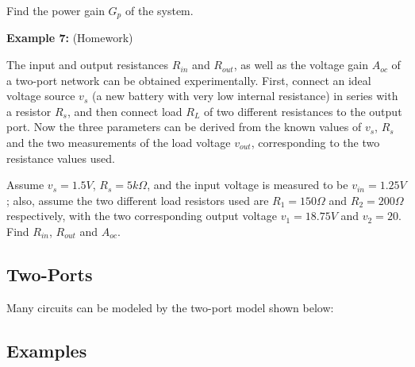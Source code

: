 Find the power gain $G_p$ of the system.



{\bf Example 7:} (Homework)

The input and output resistances $R_{in}$ and $R_{out}$, as well as the voltage 
gain $A_{oc}$ of a two-port network can be obtained experimentally. First,
connect an ideal voltage source $v_s$ (a new battery with very low internal
resistance) in series with a resistor $R_s$, and then connect load $R_L$ of
two different resistances to the output port. Now the three parameters can
be derived from the known values of $v_s$, $R_s$ and the two measurements of
the load voltage $v_{out}$, corresponding to the two resistance values used.

Assume $v_s=1.5V$, $R_s=5 k\Omega$, and the input voltage is measured to be 
$v_{in}=1.25 V$; also, assume the two different load resistors used are 
$R_1=150 \Omega$ and $R_2=200 \Omega$ respectively, with the two corresponding
output voltage $v_1=18.75V$ and $v_2=20$. Find $R_{in}$, $R_{out}$ and $A_{oc}$.





\subsection*{Two-Ports}

Many circuits can be modeled by the two-port model shown below:


	

\subsection*{Examples}
	


